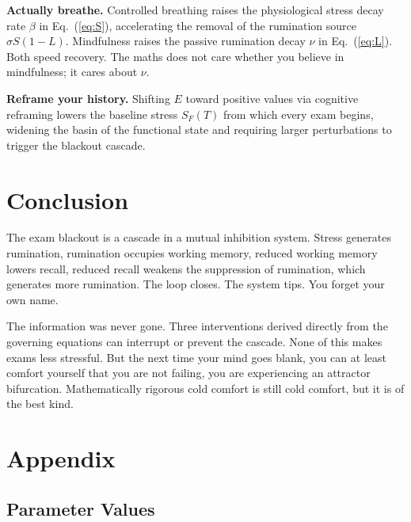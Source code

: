 \documentclass[11pt,a4paper]{article}
\begin{document}
\textbf{Actually breathe.} Controlled breathing raises the physiological
stress decay rate $\beta$ in Eq.~(\ref{eq:S}), accelerating the removal of
the rumination source $\sigma S(1-L)$. Mindfulness raises the passive
rumination decay $\nu$ in Eq.~(\ref{eq:L}). Both speed recovery.
The maths does not care whether you believe in mindfulness; it cares about $\nu$.

\textbf{Reframe your history.} Shifting $E$ toward positive values via
cognitive reframing lowers the baseline stress $S_F(T)$ from which every
exam begins, widening the basin of the functional state and requiring
larger perturbations to trigger the blackout cascade.



\section{Conclusion}

The exam blackout is a cascade in a mutual inhibition system.
Stress generates rumination, rumination occupies working memory,
reduced working memory lowers recall, reduced recall weakens the
suppression of rumination, which generates more rumination.
The loop closes. The system tips. You forget your own name.

The information was never gone. Three interventions derived directly
from the governing equations can interrupt or prevent the cascade. None of this makes
exams less stressful. But the next time your mind goes blank,
you can at least comfort yourself that you are not failing, you
are experiencing an attractor bifurcation. Mathematically rigorous
cold comfort is still cold comfort, but it is of the best kind.

\section*{Appendix}

\subsection*{Parameter Values} \vspace{-4pt}
\end{document}
